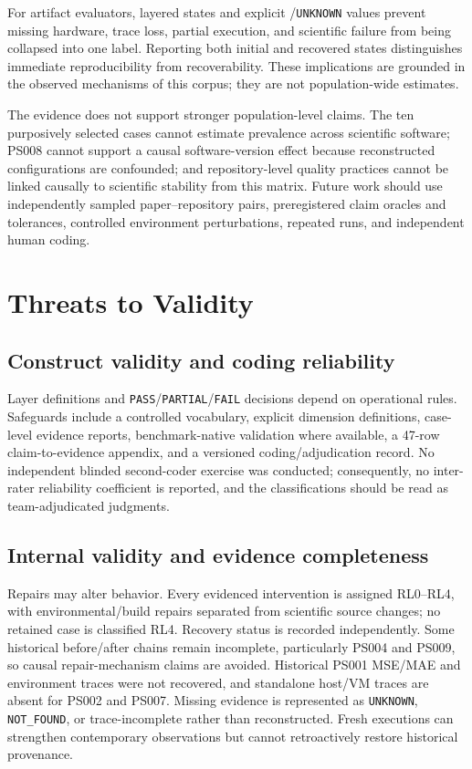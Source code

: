 \documentclass[a4paper,fleqn]{cas-dc}
\begin{document}
For artifact evaluators, layered states and explicit \protect{}/\texttt{UNKNOWN} values prevent missing hardware, trace loss, partial execution, and scientific failure from being collapsed into one label. Reporting both initial and recovered states distinguishes immediate reproducibility from recoverability. These implications are grounded in the observed mechanisms of this corpus; they are not population-wide estimates.

The evidence does not support stronger population-level claims. The ten purposively selected cases cannot estimate prevalence across scientific software; PS008 cannot support a causal software-version effect because reconstructed configurations are confounded; and repository-level quality practices cannot be linked causally to scientific stability from this matrix. Future work should use independently sampled paper--repository pairs, preregistered claim oracles and tolerances, controlled environment perturbations, repeated runs, and independent human coding.

\section{Threats to Validity}

\subsection{Construct validity and coding reliability}

Layer definitions and \texttt{PASS}/\texttt{PARTIAL}/\texttt{FAIL} decisions depend on operational rules. Safeguards include a controlled vocabulary, explicit dimension definitions, case-level evidence reports, benchmark-native validation where available, a 47-row claim-to-evidence appendix, and a versioned coding/adjudication record. No independent blinded second-coder exercise was conducted; consequently, no inter-rater reliability coefficient is reported, and the classifications should be read as team-adjudicated judgments.

\subsection{Internal validity and evidence completeness}

Repairs may alter behavior. Every evidenced intervention is assigned RL0--RL4, with environmental/build repairs separated from scientific source changes; no retained case is classified RL4. Recovery status is recorded independently. Some historical before/after chains remain incomplete, particularly PS004 and PS009, so causal repair-mechanism claims are avoided. Historical PS001 MSE/MAE and environment traces were not recovered, and standalone host/VM traces are absent for PS002 and PS007. Missing evidence is represented as \texttt{UNKNOWN}, \texttt{NOT\_FOUND}, or trace-incomplete rather than reconstructed. Fresh executions can strengthen contemporary observations but cannot retroactively restore historical provenance.
\end{document}
